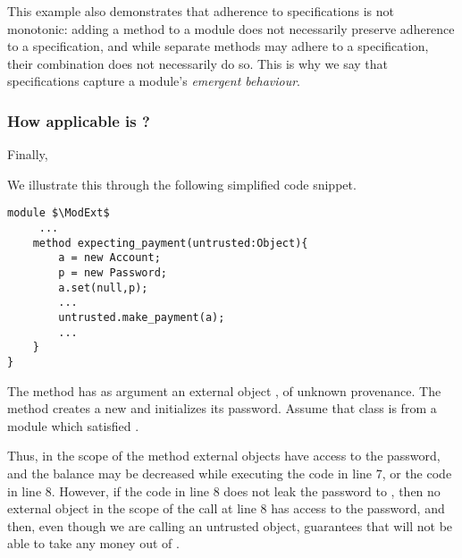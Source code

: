  This example also demonstrates that 
adherence to   \Nec specifications is not monotonic:
adding a method to a module does not necessarily preserve adherence to
a specification, 
and while separate methods may adhere to a  specification, their combination does
not necessarily do so. 
This is why we say that \Nec   specifications capture a module's \emph{emergent behaviour}. 
 

\subsubsection{How applicable is  \SrobustB?}
\label{sec:how}
Finally, 

 
We illustrate this through the following simplified code snippet.
 

\begin{lstlisting}[mathescape=true, language=chainmail, frame=lines]
module $\ModExt$
     ...
    method expecting_payment(untrusted:Object){ 
        a = new Account;
        p = new Password; 
        a.set(null,p);
        ...
        untrusted.make_payment(a);
        ...
    }
}
\end{lstlisting}
 

 The method  has as  argument an external object , of unknown provenance.
The method  creates a new  and initializes its password. 
Assume that class  is from a module which satisfied \SrobustB. 

 Thus, 
in the scope of the method  external objects have access to the password, 
and the balance may be decreased 
while executing the code in line 7, or the code in line 8. 
However, if the code in line 8 does not leak the password to , then no external object
in  the scope of the call  at line 8 has access to the password, and then,
even though we are calling   an untrusted object, \SrobustB guarantees that 
 will not be able to take any money out of  .
 

